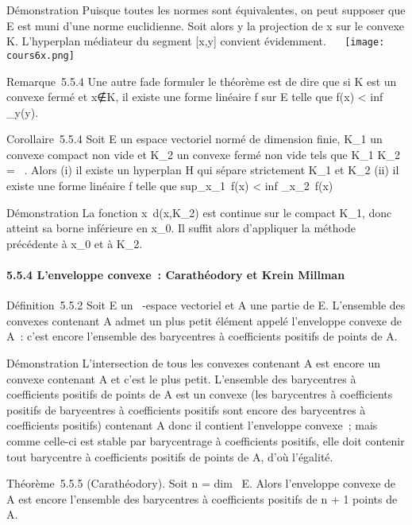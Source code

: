 \documentclass[]{article}
\begin{document}
Démonstration Puisque toutes les normes sont équivalentes, on peut
supposer que E est muni d'une norme euclidienne. Soit alors y la
projection de x sur le convexe K. L'hyperplan médiateur du segment
[x,y] convient évidemment. ~~ \texttt{[image: cours6x.png]}

Remarque~5.5.4 Une autre fa\ccon de formuler le
théorème est de dire que si K est un convexe fermé et
x∉K, il existe une forme linéaire f sur E
telle que f(x) < inf~
_y\inKf(y).

Corollaire~5.5.4 Soit E un espace vectoriel normé de dimension finie,
K_1 un convexe compact non vide et K_2 un convexe
fermé non vide tels que K_1 \bigcap K_2 = \varnothing~. Alors (i) il
existe un hyperplan H qui sépare strictement K_1 et
K_2 (ii) il existe une forme linéaire f telle que
sup_x\inK_1~f(x)
< inf _x\inK_2~f(x)

Démonstration La fonction x\mapsto~d(x,K_2)
est continue sur le compact K_1, donc atteint sa borne
inférieure en x_0. Il suffit alors d'appliquer la méthode
précédente à x_0 et à K_2.

\paragraph{5.5.4 L'enveloppe convexe~: Carathéodory et Krein Millman}

Définition~5.5.2 Soit E un ~-espace vectoriel et A une partie de E.
L'ensemble des convexes contenant A admet un plus petit élément appelé
l'enveloppe convexe de A~: c'est encore l'ensemble des barycentres à
coefficients positifs de points de A.

Démonstration L'intersection de tous les convexes contenant A est encore
un convexe contenant A et c'est le plus petit. L'ensemble des
barycentres à coefficients positifs de points de A est un convexe (les
barycentres à coefficients positifs de barycentres à coefficients
positifs sont encore des barycentres à coefficients positifs) contenant
A donc il contient l'enveloppe convexe~; mais comme celle-ci est stable
par barycentrage à coefficients positifs, elle doit contenir tout
barycentre à coefficients positifs de points de A, d'où l'égalité.

Théorème~5.5.5 (Carathéodory). Soit n = dim~ E.
Alors l'enveloppe convexe de A est encore l'ensemble des barycentres à
coefficients positifs de n + 1 points de A.
\end{document}
